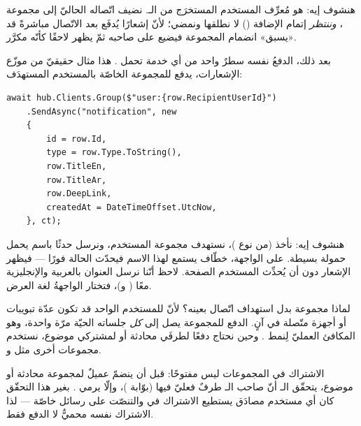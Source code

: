 هنشوف إيه:  هو مُعرِّف المستخدم المستخرَج من الـ.
نضيف اتّصاله الحاليّ إلى مجموعة ، \emph{وننتظر} إتمام الإضافة
() لا نطلقها ونمضي؛ لأنّ إشعارًا يُدفَع بعد الاتّصال مباشرةً قد «يسبق»
انضمام المجموعة فيضيع على صاحبه ثمّ يظهر لاحقًا كأنّه مكرَّر.

بعد ذلك، الدفعُ نفسه سطرٌ واحد من أي خدمة تحمل . هذا مثال حقيقيّ
من موزّع الإشعارات، يدفع للمجموعة الخاصّة بالمستخدم المستهدَف:

\begin{english}
\begin{lstlisting}[language={[Sharp]C}]
await hub.Clients.Group($"user:{row.RecipientUserId}")
    .SendAsync("notification", new
    {
        id = row.Id,
        type = row.Type.ToString(),
        row.TitleEn,
        row.TitleAr,
        row.DeepLink,
        createdAt = DateTimeOffset.UtcNow,
    }, ct);
\end{lstlisting}
\end{english}

هنشوف إيه: نأخذ  (من نوع )، نستهدف
مجموعة المستخدم، ونرسل حدثًا باسم  يحمل حمولة  بسيطة.
على الواجهة، خطّاف  يستمع لهذا الاسم فيحدّث الحالة فورًا — فيظهر الإشعار
دون أن يُحدِّث المستخدم الصفحة. لاحظ أنّنا نرسل العنوان بالعربية والإنجليزية معًا
( و)، فتختار الواجهةُ لغة العرض.

\begin{why}
لماذا مجموعة  بدل استهداف اتّصال بعينه؟ لأنّ للمستخدم الواحد قد تكون
عدّة تبويبات أو أجهزة متّصلة في آنٍ. الدفع للمجموعة يصل إلى \emph{كل} جلساته الحيّة
مرّة واحدة، وهو المكافئ العمليّ لِنمط . وحين نحتاج
دفعًا لطرفَي محادثة أو لمشتركي موضوع، نستخدم مجموعات أخرى مثل
 و.
\end{why}

\begin{secnote}
الاشتراك في المجموعات ليس مفتوحًا: قبل أن ينضمّ عميلٌ لمجموعة محادثة أو موضوع، يتحقّق
الـ أنّ صاحب الـ طرفٌ فعليّ فيها (بوّابة )، وإلّا يرمي
. بغير هذا التحقّق كان أي مستخدم مصادَق يستطيع الاشتراك في
 والتنصّت على رسائل خاصّة — لذا الاشتراك نفسه محميٌّ لا الدفع
فقط.
\end{secnote}

